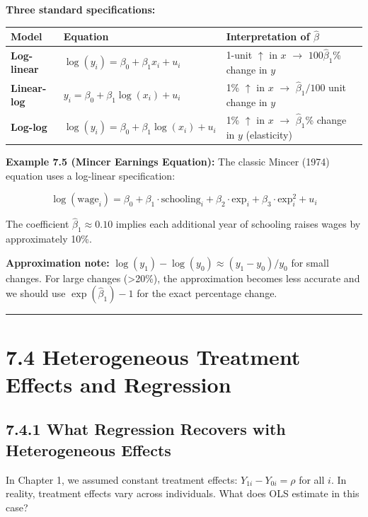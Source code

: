 \textbf{Three standard specifications:}

\begin{center}
\begin{tabular}{@{} l l l @{}}
\toprule
\textbf{Model} & \textbf{Equation} & \textbf{Interpretation of $\hat{\beta}$} \\
\midrule
\textbf{Log-linear} & $\log(y_i) = \beta_0 + \beta_1 x_i + u_i$ & 1-unit $\uparrow$ in $x$ $\to$ $100\hat{\beta}_1$\% change in $y$ \\
\textbf{Linear-log} & $y_i = \beta_0 + \beta_1 \log(x_i) + u_i$ & 1\% $\uparrow$ in $x$ $\to$ $\hat{\beta}_1/100$ unit change in $y$ \\
\textbf{Log-log} & $\log(y_i) = \beta_0 + \beta_1 \log(x_i) + u_i$ & 1\% $\uparrow$ in $x$ $\to$ $\hat{\beta}_1$\% change in $y$ (elasticity) \\
\bottomrule
\end{tabular}
\end{center}

\textbf{Example 7.5 (Mincer Earnings Equation):} The classic Mincer (1974) equation uses a log-linear specification:

\[
\log(\text{wage}_i) = \beta_0 + \beta_1 \cdot \text{schooling}_i + \beta_2 \cdot \text{exp}_i + \beta_3 \cdot \text{exp}_i^2 + u_i
\]

The coefficient $\hat{\beta}_1 \approx 0.10$ implies each additional year of schooling raises wages by approximately 10\%.

\textbf{Approximation note:} $\log(y_1) - \log(y_0) \approx (y_1 - y_0)/y_0$ for small changes. For large changes (>20\%), the approximation becomes less accurate and we should use $\exp(\hat{\beta}_1) - 1$ for the exact percentage change.

\medskip\hrule\medskip

\section{7.4 Heterogeneous Treatment Effects and Regression}

\subsection{7.4.1 What Regression Recovers with Heterogeneous Effects}

In Chapter 1, we assumed constant treatment effects: $Y_{1i} - Y_{0i} = \rho$ for all $i$. In reality, treatment effects vary across individuals. What does OLS estimate in this case?

